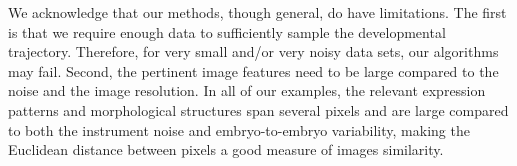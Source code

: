 \documentclass[twocolumn, 10pt]{article}
\begin{document}
We acknowledge that our methods, though general, do have limitations.
%
The first is that we require enough data to sufficiently sample the developmental trajectory.
%
Therefore, for very small and/or very noisy data sets, our algorithms may fail.
%
Second, the pertinent image features need to be large compared to the noise and the image resolution.
%
In all of our examples, the relevant expression patterns and morphological structures span several pixels and are large compared to both the instrument noise and embryo-to-embryo variability, making the Euclidean distance between pixels a good measure of images similarity.
%
%
%
%
%

%
%
%
%
\end{document}
